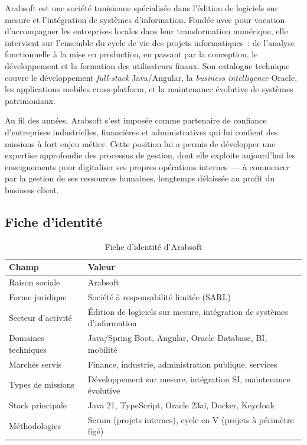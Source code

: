 Arabsoft est une société tunisienne spécialisée dans l'édition de logiciels sur
mesure et l'intégration de systèmes d'information. Fondée avec pour vocation
d'accompagner les entreprises locales dans leur transformation numérique, elle
intervient sur l'ensemble du cycle de vie des projets informatiques~: de l'analyse
fonctionnelle à la mise en production, en passant par la conception, le développement
et la formation des utilisateurs finaux. Son catalogue technique couvre le
développement \textit{full-stack} Java/Angular, la \textit{business intelligence}
Oracle, les applications mobiles cross-platform, et la maintenance évolutive de
systèmes patrimoniaux.

Au fil des années, Arabsoft s'est imposée comme partenaire de confiance d'entreprises
industrielles, financières et administratives qui lui confient des missions à fort
enjeu métier. Cette position lui a permis de développer une expertise approfondie
des processus de gestion, dont elle exploite aujourd'hui les enseignements pour
digitaliser ses propres opérations internes~--- à commencer par la gestion de ses
ressources humaines, longtemps délaissée au profit du business client.

\subsection{Fiche d'identité}

\begin{table}[H]
\centering
\caption{Fiche d'identité d'Arabsoft}
\label{tab:fiche}
\begin{tabularx}{\textwidth}{|l|L|}
\hline
{}\textbf{Champ} & \textbf{Valeur} \\\hline
{}Raison sociale & Arabsoft \\\hline
Forme juridique & Société à responsabilité limitée (SARL) \\\hline
{}Secteur d'activité & Édition de logiciels sur mesure, intégration de systèmes d'information \\\hline
Domaines techniques & Java/Spring Boot, Angular, Oracle Database, BI, mobilité \\\hline
{}Marchés servis & Finance, industrie, administration publique, services \\\hline
Types de missions & Développement sur mesure, intégration SI, maintenance évolutive \\\hline
{}Stack principale & Java 21, TypeScript, Oracle 23ai, Docker, Keycloak \\\hline
Méthodologies & Scrum (projets internes), cycle en V (projets à périmètre figé) \\\hline
\end{tabularx}
\end{table}

